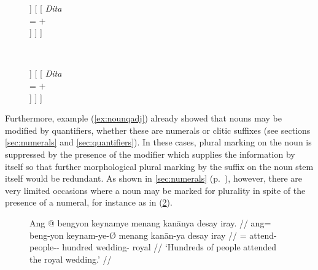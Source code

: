 \begin{figure}
\ex\label{ex:animcaseagrname}
\begin{minipage}[t]{.5\remaining}
\tl\quad\label{ex:animokname} %
\begin{forest}
[\anno{\xhead{N}}
	[\anno{Cl}
		[{%
			\textit{ang} \\
			\ups{\Anim} = $+$ \\
			\ups{\Case} = \Aarg{} \\
		}]
	]
	[
		[{%
			\textit{Dita} \\
			\ups{\Anim} = $+$ \\
		}]
	]
]
\end{forest}
\end{minipage}
~
\begin{minipage}[t]{.5\remaining}
\tl\quad\label{ex:animclashname} %
\ljudge*\begin{forest}
[\anno{\xhead{N}}
	[\anno{Cl}
		[{%
			\textit{eng} \\
			\ups{\Anim} = $-$ \\
			\ups{\Case} = \Aarg{} \\
		}]
	]
	[
		[{%
			\textit{Dita} \\
			\ups{\Anim} = $+$ \\
		}]
	]
]
\end{forest}
\end{minipage}
\xe
\end{figure}

Furthermore, example (\ref{ex:nounqadj}) already showed that nouns may be
modified by quantifiers, whether these are numerals
or clitic suffixes (see sections \ref{sec:numerals} and \ref{sec:quantifiers}). In these
cases, plural marking on the noun is suppressed by the presence of the modifier
which supplies the information by itself so that further morphological plural
marking by the suffix  on the noun stem itself would be
redundant. As shown in \autoref{sec:numerals} (p.~\pageref{hundreds}), however,
there are very limited occasions where a noun may be marked for plurality in
spite of the presence of a numeral, for instance as in (\ref{ex:plovermkg}).

\begin{figure}[h]
\ex\label{ex:plovermkg}\begingl
	\gla Ang @ bengyon keynamye menang kanānya {desay iray}. //
	\glb ang= beng-yon keynam-ye-Ø menang kanān-ya {desay iray} //
	\glc \AgtT{}= attend-\TplN{} people-\Pl{}-\Top{} hundred wedding-\Loc{} 
		royal //
	\glft `Hundreds of people attended the royal wedding.' //
\endgl\xe
\end{figure}

